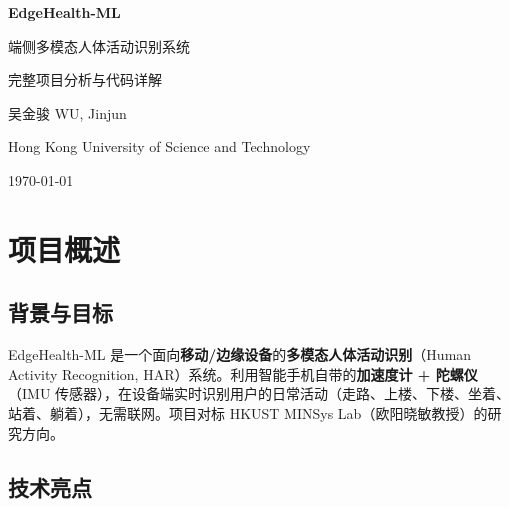 \documentclass[12pt,a4paper]{ctexart}
\begin{document}
\begin{center}
    {\huge\bfseries EdgeHealth-ML}

    \vspace{0.3em}
    {\LARGE 端侧多模态人体活动识别系统}

    \vspace{0.5em}
    {\large 完整项目分析与代码详解}

    \vspace{2em}
    {\normalsize 吴金骏 \textbar{} WU, Jinjun}

    \vspace{0.2em}
    {\normalsize Hong Kong University of Science and Technology}

    \vspace{0.2em}
    {\normalsize \today}
\end{center}

\begin{center}
\end{center}

\newpage
\section{项目概述}

\subsection{背景与目标}

EdgeHealth-ML 是一个面向\textbf{移动/边缘设备}的\textbf{多模态人体活动识别}（Human Activity Recognition, HAR）系统。利用智能手机自带的\textbf{加速度计 + 陀螺仪}（IMU 传感器），在设备端实时识别用户的日常活动（走路、上楼、下楼、坐着、站着、躺着），无需联网。项目对标 HKUST MINSys Lab（欧阳晓敏教授）的研究方向。

\subsection{技术亮点}
\end{document}

